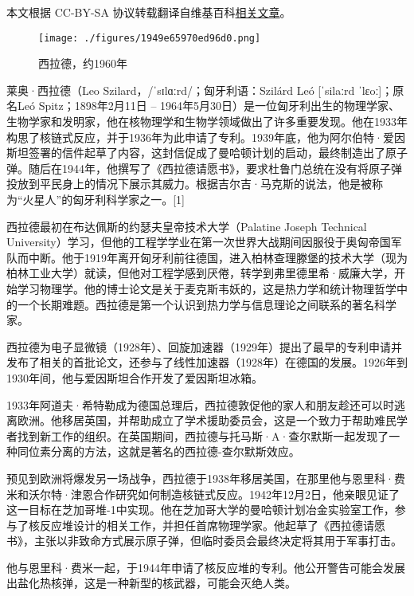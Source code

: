 
本文根据 CC-BY-SA 协议转载翻译自维基百科\href{https://en.wikipedia.org/wiki/Leo_Szilard}{相关文章}。

\begin{figure}[ht]
\centering
\texttt{[image: ./figures/1949e65970ed96d0.png]}
\caption{西拉德，约1960年} \label{fig_Szilar_1}
\end{figure}
莱奥·西拉德（Leo Szilard，/ˈsɪlɑːrd/；匈牙利语：Szilárd Leó [ˈsilaːrd ˈlɛoː]；原名Leó Spitz；1898年2月11日 – 1964年5月30日）是一位匈牙利出生的物理学家、生物学家和发明家，他在核物理学和生物学领域做出了许多重要发现。他在1933年构思了核链式反应，并于1936年为此申请了专利。1939年底，他为阿尔伯特·爱因斯坦签署的信件起草了内容，这封信促成了曼哈顿计划的启动，最终制造出了原子弹。随后在1944年，他撰写了《西拉德请愿书》，要求杜鲁门总统在没有将原子弹投放到平民身上的情况下展示其威力。根据吉尔吉·马克斯的说法，他是被称为“火星人”的匈牙利科学家之一。[1]

西拉德最初在布达佩斯的约瑟夫皇帝技术大学（Palatine Joseph Technical University）学习，但他的工程学学业在第一次世界大战期间因服役于奥匈帝国军队而中断。他于1919年离开匈牙利前往德国，进入柏林查理滕堡的技术大学（现为柏林工业大学）就读，但他对工程学感到厌倦，转学到弗里德里希·威廉大学，开始学习物理学。他的博士论文是关于麦克斯韦妖的，这是热力学和统计物理哲学中的一个长期难题。西拉德是第一个认识到热力学与信息理论之间联系的著名科学家。

西拉德为电子显微镜（1928年）、回旋加速器（1929年）提出了最早的专利申请并发布了相关的首批论文，还参与了线性加速器（1928年）在德国的发展。1926年到1930年间，他与爱因斯坦合作开发了爱因斯坦冰箱。

1933年阿道夫·希特勒成为德国总理后，西拉德敦促他的家人和朋友趁还可以时逃离欧洲。他移居英国，并帮助成立了学术援助委员会，这是一个致力于帮助难民学者找到新工作的组织。在英国期间，西拉德与托马斯·A·查尔默斯一起发现了一种同位素分离的方法，这就是著名的西拉德-查尔默斯效应。

预见到欧洲将爆发另一场战争，西拉德于1938年移居美国，在那里他与恩里科·费米和沃尔特·津恩合作研究如何制造核链式反应。1942年12月2日，他亲眼见证了这一目标在芝加哥堆-1中实现。他在芝加哥大学的曼哈顿计划冶金实验室工作，参与了核反应堆设计的相关工作，并担任首席物理学家。他起草了《西拉德请愿书》，主张以非致命方式展示原子弹，但临时委员会最终决定将其用于军事打击。

他与恩里科·费米一起，于1944年申请了核反应堆的专利。他公开警告可能会发展出盐化热核弹，这是一种新型的核武器，可能会灭绝人类。

